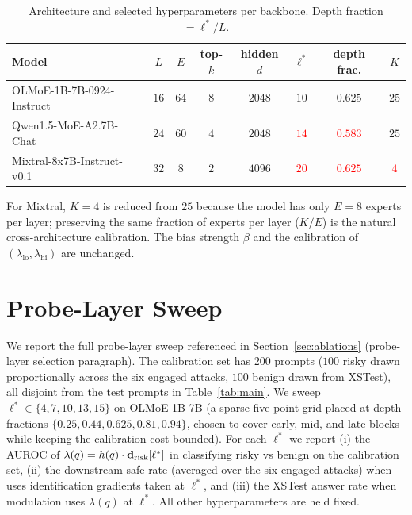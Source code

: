 \begin{table}[h]
\centering
\caption{Architecture and selected hyperparameters per backbone. Depth fraction $= \ell^* / L$.}
\label{tab:model-details}
\small
\begin{tabular}{lccccccc}
\toprule
Model & $L$ & $E$ & top-$k$ & hidden $d$ & $\ell^*$ & depth frac. & $K$ \\
\midrule
OLMoE-1B-7B-0924-Instruct        & $16$ & $64$ & $8$ & $2048$ & $10$ & $0.625$ & $25$ \\
Qwen1.5-MoE-A2.7B-Chat & $24$ & $60$ & $4$ & $2048$ & \textcolor{red}{$14$} & \textcolor{red}{$0.583$} & $25$ \\
Mixtral-8x7B-Instruct-v0.1 & $32$ & $8$  & $2$ & $4096$ & \textcolor{red}{$20$} & \textcolor{red}{$0.625$} & \textcolor{red}{$4$} \\
\bottomrule
\end{tabular}
\end{table}

For Mixtral, $K{=}4$ is reduced from $25$ because the model has only $E{=}8$ experts per layer; preserving the same fraction of experts per layer ($K/E$) is the natural cross-architecture calibration. The bias strength $\beta$ and the calibration of $(\lambda_{\text{lo}}, \lambda_{\text{hi}})$ are unchanged.

\section{Probe-Layer Sweep}
\label{app:probe_layer}

We report the full probe-layer sweep referenced in Section~\ref{sec:ablations} (probe-layer selection paragraph). The calibration set has $200$ prompts ($100$ risky drawn proportionally across the six engaged attacks, $100$ benign drawn from XSTest), all disjoint from the test prompts in Table~\ref{tab:main}. We sweep $\ell^* \in \{4, 7, 10, 13, 15\}$ on OLMoE-1B-7B (a sparse five-point grid placed at depth fractions $\{0.25, 0.44, 0.625, 0.81, 0.94\}$, chosen to cover early, mid, and late blocks while keeping the calibration cost bounded). For each $\ell^*$ we report (i) the AUROC of $\lambda(q) = h(q) \cdot \mathbf{d}_{\text{risk}}[\ell^*]$ in classifying risky vs benign on the calibration set, (ii) the downstream safe rate (averaged over the six engaged attacks) when \name uses identification gradients taken at $\ell^*$, and (iii) the XSTest answer rate when modulation uses $\lambda(q)$ at $\ell^*$. All other hyperparameters are held fixed.

